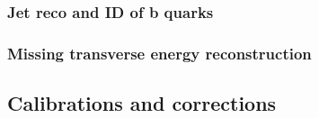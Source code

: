 \subsubsection{Jet reco and ID of b quarks}
\begin{comment}


\end{comment}
\subsubsection{Missing transverse energy reconstruction}
\subsection{Calibrations and corrections}
